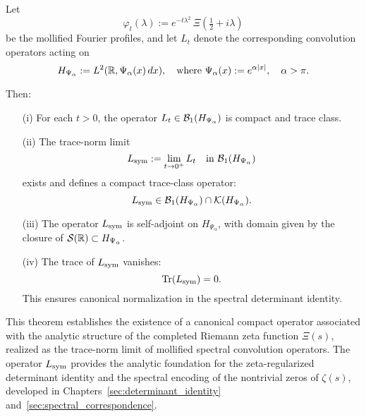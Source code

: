\begin{theorem}
\label{thm:existence_Lsym}
Let
\[
\varphi_t(\lambda) := e^{-t\lambda^2} \, \Xi\left( \tfrac{1}{2} + i\lambda \right)
\]
be the mollified Fourier profiles, and let \( L_t \) denote the corresponding convolution operators acting on
\[
H_{\Psi_\alpha} := L^2(\mathbb{R}, \Psi_\alpha(x)\, dx),
\quad \text{where } \Psi_\alpha(x) := e^{\alpha |x|}, \quad \alpha > \pi.
\]

Then:
\begin{enumerate}
  \item[\textnormal{(i)}] For each \( t > 0 \), the operator \( L_t \in \mathcal{B}_1(H_{\Psi_\alpha}) \) is compact and trace class.

  \item[\textnormal{(ii)}] The trace-norm limit
  \[
  L_{\mathrm{sym}} := \lim_{t \to 0^+} L_t \quad \text{in } \mathcal{B}_1(H_{\Psi_\alpha})
  \]
  exists and defines a compact trace-class operator:
  \[
  L_{\mathrm{sym}} \in \mathcal{B}_1(H_{\Psi_\alpha}) \cap \mathcal{K}(H_{\Psi_\alpha}).
  \]

  \item[\textnormal{(iii)}] The operator \( L_{\mathrm{sym}} \) is self-adjoint on \( H_{\Psi_\alpha} \), with domain given by the closure of \( \mathcal{S}(\mathbb{R}) \subset H_{\Psi_\alpha} \).

  \item[\textnormal{(iv)}] The trace of \( L_{\mathrm{sym}} \) vanishes:
  \[
  \operatorname{Tr}(L_{\mathrm{sym}}) = 0.
  \]
  This ensures canonical normalization in the spectral determinant identity.
\end{enumerate}

\medskip
\noindent
This theorem establishes the existence of a canonical compact operator associated with the analytic structure of the completed Riemann zeta function \( \Xi(s) \), realized as the trace-norm limit of mollified spectral convolution operators. The operator \( L_{\mathrm{sym}} \) provides the analytic foundation for the zeta-regularized determinant identity and the spectral encoding of the nontrivial zeros of \( \zeta(s) \), developed in Chapters~\ref{sec:determinant_identity} and~\ref{sec:spectral_correspondence}.
\end{theorem}
